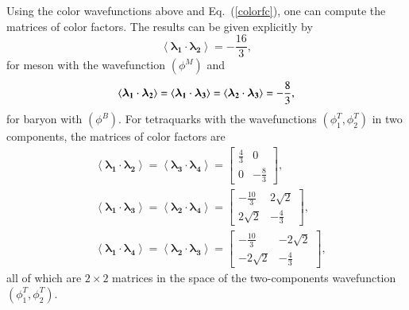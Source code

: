 \documentclass[prd,twocolumn,floatfix,nofootinbib]{revtex4}
\begin{document}
Using the color wavefunctions above and Eq.~(\ref{colorfc}), one can compute
the matrices of color factors. The results can be given explicitly by
\begin{equation}
\left\langle \boldsymbol{\lambda _{1}}\cdot \boldsymbol{\lambda _{2}}%
\right\rangle =-\frac{16}{3},  \label{cfcM}
\end{equation}%
for meson with the wavefunction $(\phi ^{M})$ and
\begin{equation}
\left\langle \boldsymbol{\lambda _{1}}\cdot \boldsymbol{\lambda _{2}}%
\right\rangle =\left\langle \boldsymbol{\lambda _{1}}\cdot \boldsymbol{%
\lambda _{3}}\right\rangle =\left\langle \boldsymbol{\lambda _{2}}\cdot
\boldsymbol{\lambda _{3}}\right\rangle =-\frac{8}{3},  \label{cfcB}
\end{equation}%
for baryon with $(\phi ^{B})$. For tetraquarks with the wavefunctions $(\phi
_{1}^{T},\phi _{2}^{T})$ in two components, the matrices of color factors
are
\begin{equation}
\begin{aligned} &\left\langle \boldsymbol{\lambda_{1}}\cdot
\boldsymbol{\lambda_{2}} \right\rangle= \left\langle
\boldsymbol{\lambda_{3}}\cdot \boldsymbol{\lambda_{4}} \right\rangle=
\begin{bmatrix} \frac{4}{3} & 0 \\ 0 & -\frac{8}{3} \end{bmatrix}, \\
&\left\langle \boldsymbol{\lambda_{1}}\cdot \boldsymbol{\lambda_{3}}
\right\rangle= \left\langle \boldsymbol{\lambda_{2}}\cdot
\boldsymbol{\lambda_{4}} \right\rangle= \begin{bmatrix} -\frac{10}{3} &
2\sqrt{2} \\ 2\sqrt{2} & -\frac{4}{3} \end{bmatrix}, \\ &\left\langle
\boldsymbol{\lambda_{1}}\cdot \boldsymbol{\lambda_{4}} \right\rangle=
\left\langle \boldsymbol{\lambda_{2}}\cdot \boldsymbol{\lambda_{3}}
\right\rangle= \begin{bmatrix} -\frac{10}{3} & -2\sqrt{2} \\ -2\sqrt{2} &
-\frac{4}{3} \end{bmatrix}, \end{aligned}  \label{cfcT}
\end{equation}%
all of which are $2\times 2$ matrices in the space of the two-components
wavefunction $(\phi _{1}^{T},\phi _{2}^{T})$.

\medskip
\end{document}
